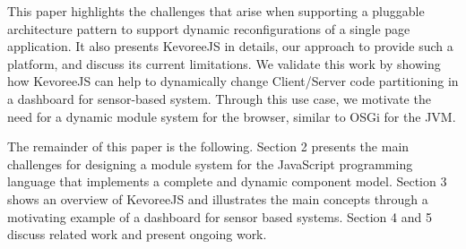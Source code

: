 This paper highlights the challenges that arise when supporting a pluggable architecture pattern to support dynamic reconfigurations of a single page application. It also presents KevoreeJS in details, our approach to provide such a platform, and discuss its current limitations. We validate this work by showing how KevoreeJS can help to dynamically change Client/Server code partitioning in a dashboard for sensor-based system. Through this use case, we motivate the need for a dynamic module system for the browser, similar to OSGi for the JVM.  

\enlargethispage{0.5cm}

The remainder of this paper is the following. Section 2 presents the main challenges for designing a module system for the JavaScript programming language that implements a complete and dynamic component model. Section 3 shows an overview of KevoreeJS and illustrates the main concepts through a motivating example of a dashboard for sensor based systems. Section 4 and 5 discuss related work and present ongoing work. 